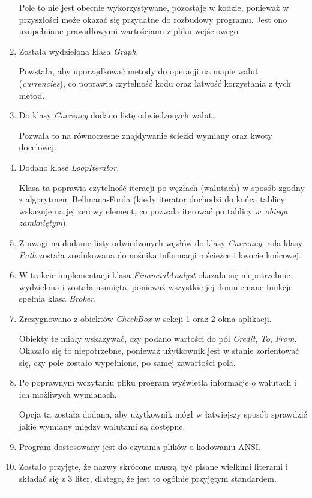\documentclass[a4paper,11pt]{article}
\newcommand{\linia}{\rule{\linewidth}{0.4mm}}
\begin{document}
\begin{enumerate}
Pole to nie jest obecnie wykorzystywane, pozostaje w kodzie, ponieważ w przyszłości może okazać się przydatne do rozbudowy programu. Jest ono uzupełniane prawidłowymi wartościami z pliku wejściowego.

\item Została wydzielona klasa \textit{Graph}.

Powstała, aby uporządkować metody do operacji na mapie walut (\textit{currencies}), co poprawia czytelność kodu oraz łatwość korzystania z tych metod.
\item Do klasy \textit{Currency} dodano listę odwiedzonych walut.

Pozwala to na równoczesne znajdywanie ścieżki wymiany oraz kwoty docelowej.
\item Dodano klase \textit{LoopIterator}.

Klasa ta poprawia czytelność iteracji po węzłach (walutach) w sposób zgodny z algorytmem Bellmana-Forda (kiedy iterator dochodzi do końca tablicy wskazuje na jej zerowy element, co pozwala iterować po tablicy \textit{w~obiegu zamkniętym}).
\item Z uwagi na dodanie listy odwiedzonych węzłów do klasy \textit{Currency},  rola klasy \textit{Path} została zredukowana do nośnika informacji o ścieżce i kwocie końcowej.

\item W trakcie implementacji klasa \textit{FinancialAnalyst} okazała się niepotrzebnie wydzielona i została usunięta, ponieważ wszystkie jej domniemane funkcje spełnia klasa \textit{Broker}.
\item Zrezygnowano z obiektów \textit{CheckBox} w sekcji 1 oraz 2 okna aplikacji.

Obiekty te miały wskazywać, czy podano wartości do pól \textit{Credit}, \textit{To}, \textit{From}. Okazało się to niepotrzebne, ponieważ użytkownik jest w stanie zorientować się, czy pole zostało wypełnione, po samej zawartości pola.
\item Po poprawnym wczytaniu pliku program wyświetla informacje o walutach i ich możliwych wymianach.

Opcja ta została dodana, aby użytkownik mógł w łatwiejszy sposób sprawdzić jakie wymiany między walutami są dostępne.
\item Program dostosowany jest do czytania plików o kodowaniu ANSI.
\item Zostało przyjęte, że nazwy skrócone muszą być pisane wielkimi literami i składać się z 3 liter, dlatego, że jest to ogólnie przyjętym standardem.
\end{enumerate}
\noindent\linia
\end{document}
